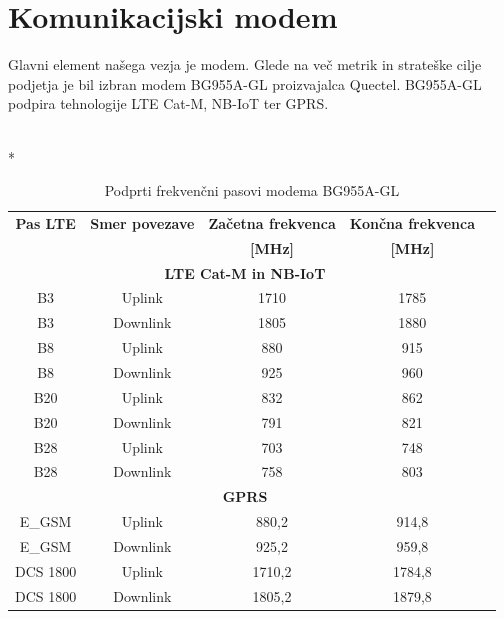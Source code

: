 \documentclass[a4paper,twoside,openright,12pt,slovene]{book}
\begin{document}
\section{Komunikacijski modem}
Glavni element našega vezja je modem. Glede na več metrik in strateške cilje podjetja je bil izbran modem BG955A-GL proizvajalca Quectel. BG955A-GL podpira tehnologije LTE Cat-M, NB-IoT ter GPRS.

\begin{table}[h]
    \centering
    \caption{\label{tab:bg955_bands} Podprti frekvenčni pasovi modema BG955A-GL}
    ~\\*
    \begin{tabular}{ccccc} 
    \hline
    \rule{0pt}{3ex}
    
       \textbf{Pas LTE} &
       \textbf{Smer povezave} &
       \textbf{Začetna frekvenca} &
       \textbf{Končna frekvenca}  \\
       \textbf{} & 
       \textbf{} & 
       \textbf{[MHz]} &
       \textbf{[MHz]} \\ 
   \hline
       \multicolumn{4}{c}{\textbf{LTE Cat-M in NB-IoT}} \\ \hline
        B3	& Uplink   & 1710	& 1785 \\
        B3  & Downlink & 1805   & 1880 \\
        B8  & Uplink   & 880    & 915  \\
        B8  & Downlink & 925    & 960  \\
        B20 & Uplink   & 832    & 862  \\
        B20 & Downlink & 791    & 821  \\
        B28 & Uplink   & 703    & 748  \\
        B28 & Downlink & 758    & 803  \\ \hline
        \multicolumn{4}{c}{\textbf{GPRS}} \\ \hline
        E\_GSM    & Uplink   & 880{,}2  & 914{,}8  \\
        E\_GSM    & Downlink & 925{,}2  & 959{,}8  \\
        DCS 1800 & Uplink   & 1710{,}2 & 1784{,}8 \\
        DCS 1800 & Downlink & 1805{,}2 & 1879{,}8 \\ \hline
    \end{tabular}
\end{table}
\end{document}
